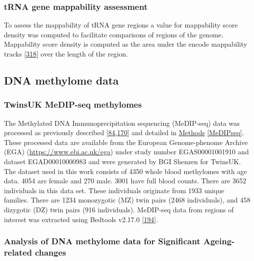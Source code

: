 \documentclass[
]{book}
\begin{document}
\hypertarget{mappabilityDensity}{%
\subsubsection{tRNA gene mappability assessment}\label{mappabilityDensity}}

To assess the mappability of tRNA gene regions a value for mappability score density was computed to facilitate comparisons of regions of the genome.
Mappability score density is computed as the area under the encode mappability tracks {[}\protect\hyperlink{ref-Derrien2012}{318}{]} over the length of the region.

\hypertarget{dna-methylome-data}{%
\subsection{DNA methylome data}\label{dna-methylome-data}}

\hypertarget{EpiTwinsMethods}{%
\subsubsection{TwinsUK MeDIP-seq methylomes}\label{EpiTwinsMethods}}

The Methylated DNA Immunoprecipitation sequencing (MeDIP-seq) data was processed as previously described {[}\protect\hyperlink{ref-Bell2017a}{84},\protect\hyperlink{ref-Bell2016}{170}{]} and detailed in \protect\hyperlink{MeDIPseq}{Methods} \ref{MeDIPseq}.
These processed data are available from the European Genome-phenome Archive (EGA) (\url{https://www.ebi.ac.uk/ega}) under study number EGAS00001001910 and dataset EGAD00010000983 and were generated by BGI Shenzen for TwinsUK.
The dataset used in this work consists of 4350 whole blood methylomes with age data.
4054 are female and 270 male.
3001 have full blood counts.
There are 3652 individuals in this data set.
These individuals originate from 1933 unique families.
There are 1234 monozygotic (MZ) twin pairs (2468 individuals), and 458 dizygotic (DZ) twin pairs (916 individuals).
MeDIP-seq data from regions of interest was extracted using Bedtools v2.17.0 {[}\protect\hyperlink{ref-Quinlan2010}{194}{]}.

\hypertarget{medipmodels}{%
\subsubsection{Analysis of DNA methylome data for Significant Ageing-related changes}\label{medipmodels}}
\end{document}
